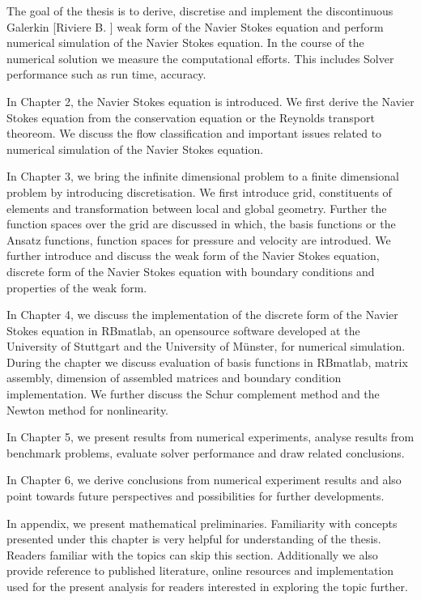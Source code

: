 \documentclass[a4paper]{book}
\begin{document}
The goal of the thesis is to derive, discretise and implement the discontinuous Galerkin [Riviere B. \cite{riviere}] weak form of the Navier Stokes equation and perform numerical simulation of the Navier Stokes equation. In the course of the numerical solution we measure the computational efforts. This includes Solver performance such as run time, accuracy.

In Chapter 2, the Navier Stokes equation is introduced. We first derive the Navier Stokes equation from the conservation equation or the Reynolds transport theoreom. We discuss the flow classification and important issues related to numerical simulation of the Navier Stokes equation. 

In Chapter 3, we bring the infinite dimensional problem to a finite dimensional problem by introducing discretisation. We first introduce grid, constituents of elements and transformation between local and global geometry. Further the function spaces over the grid are discussed in which, the basis functions or the Ansatz functions, function spaces for pressure and velocity are introdued. We further introduce and discuss the weak form of the Navier Stokes equation, discrete form of the Navier Stokes equation with boundary conditions and properties of the weak form.

In Chapter 4, we discuss the implementation of the discrete form of the Navier Stokes equation in RBmatlab, an opensource software developed at the University of Stuttgart and the University of M\"unster, for numerical simulation. During the chapter we discuss evaluation of basis functions in RBmatlab, matrix assembly, dimension of assembled matrices and boundary condition implementation. We further discuss the Schur complement method and the Newton method for nonlinearity.

In Chapter 5, we present results from numerical experiments, analyse results from benchmark problems, evaluate solver performance and draw related conclusions.

In Chapter 6, we derive conclusions from numerical experiment results and also point towards future perspectives and possibilities for further developments.

In appendix, we present mathematical preliminaries. Familiarity with concepts presented under this chapter is very helpful for understanding of the thesis. Readers familiar with the topics can skip this section. Additionally we also provide reference to published literature, online resources and implementation used for the present analysis for readers interested in exploring the topic further.
\end{document}
